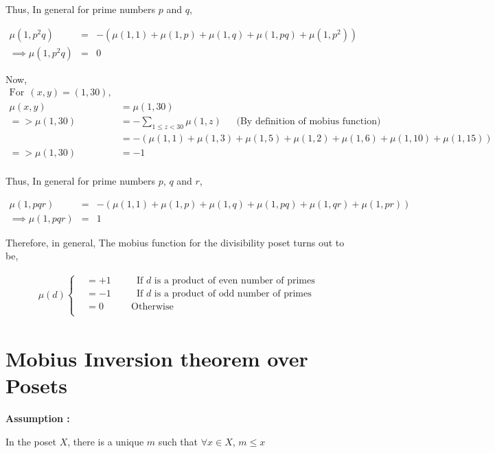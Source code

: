 Thus, In general for prime numbers $p$ and $q$,

\begin{eqnarray*}
\mu(1,p^2 q) & = & -(\mu(1,1) + \mu(1,p) + \mu(1,q) + \mu(1,p q) + \mu(1,p^2) ) \\
\implies \mu(1,p^2 q) & = & 0
\end{eqnarray*}

\noindent Now,
\begin{align*}
\textrm{For} ~~(x,y) = (1,30),\\
    \mu (x,y) &= \mu (1,30)\\
=>  \mu (1,30) &= -\sum\limits_{1 \le z < 30} \mu(1,z)    ~~~~~~~\textrm{(By definition of mobius function)}\\
    &= - (\mu(1,1) + \mu(1,3) + \mu(1,5) + \mu(1,2) + \mu(1,6) + \mu(1,10) + \mu(1,15)) \\
=>  \mu(1,30) &= -1\\
\end{align*}

Thus, In general for prime numbers $p$, $q$ and $r$,

\begin{eqnarray*}
\mu(1,p q r) & = & -(\mu(1,1) + \mu(1,p) + \mu(1,q) + \mu(1,p q) + \mu(1,q r) + \mu (1, p r) ) \\
\implies \mu(1,p q r) & = & 1
\end{eqnarray*}

Therefore, in general, The mobius function for the divisibility poset turns out to be,

\begin{eqnarray*}
\mu (d)
    \begin{cases}
        &= +1 ~~~~~~~~~~~~\textrm{If $d$ is a product of even number of primes}\\
        &= -1 ~~~~~~~~~~~~\textrm{If $d$ is a product of odd number of primes}\\
        &= 0 ~~~~~~~~~~~~~\textrm{Otherwise}\\
    \end{cases}
\end{eqnarray*}

\section{Mobius Inversion theorem over Posets}

\textbf{Assumption :}

\noindent In the poset $X$, there is a unique $m$ such that $\forall x \in X$, $m \le x$

